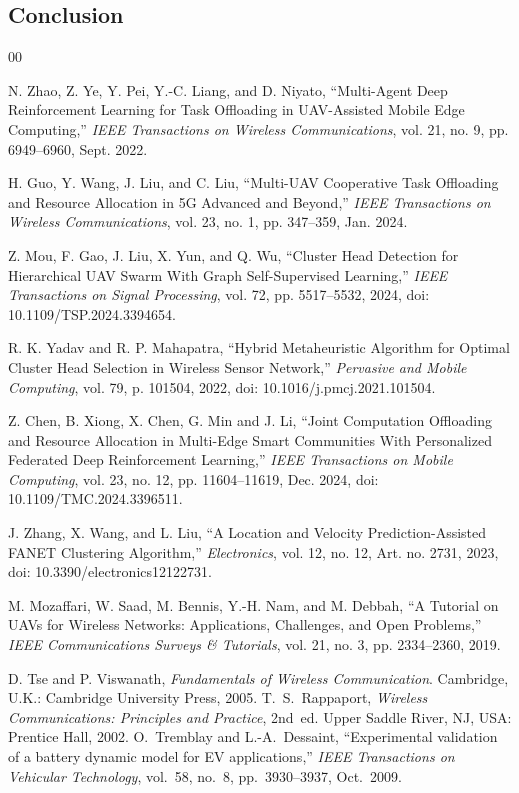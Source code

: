 \documentclass[journal]{IEEEtran}
\begin{document}
\begin{IEEEproof}
\section{Conclusion}


\begin{thebibliography}{00}

N. Zhao, Z. Ye, Y. Pei, Y.-C. Liang, and D. Niyato,
``Multi-Agent Deep Reinforcement Learning for Task Offloading in UAV-Assisted Mobile Edge Computing,''
\emph{IEEE Transactions on Wireless Communications},
vol. 21, no. 9, pp. 6949--6960, Sept. 2022.

H. Guo, Y. Wang, J. Liu, and C. Liu,
``Multi-UAV Cooperative Task Offloading and Resource Allocation in 5G Advanced and Beyond,''
\emph{IEEE Transactions on Wireless Communications},
vol. 23, no. 1, pp. 347--359, Jan. 2024.

Z. Mou, F. Gao, J. Liu, X. Yun, and Q. Wu,
``Cluster Head Detection for Hierarchical UAV Swarm With Graph Self-Supervised Learning,''
\emph{IEEE Transactions on Signal Processing},
vol. 72, pp. 5517--5532, 2024,
doi: 10.1109/TSP.2024.3394654.

R. K. Yadav and R. P. Mahapatra,
``Hybrid Metaheuristic Algorithm for Optimal Cluster Head Selection in Wireless Sensor Network,''
\emph{Pervasive and Mobile Computing},
vol. 79, p. 101504, 2022,
doi: 10.1016/j.pmcj.2021.101504.

Z. Chen, B. Xiong, X. Chen, G. Min and J. Li,
``Joint Computation Offloading and Resource Allocation in Multi-Edge Smart Communities With Personalized Federated Deep Reinforcement Learning,''
\emph{IEEE Transactions on Mobile Computing},
vol. 23, no. 12, pp. 11604--11619, Dec. 2024,
doi: 10.1109/TMC.2024.3396511.

J. Zhang, X. Wang, and L. Liu,
``A Location and Velocity Prediction-Assisted FANET Clustering Algorithm,''
\emph{Electronics},
vol. 12, no. 12, Art. no. 2731, 2023,
doi: 10.3390/electronics12122731.

M. Mozaffari, W. Saad, M. Bennis, Y.-H. Nam, and M. Debbah,
``A Tutorial on UAVs for Wireless Networks: Applications, Challenges, and Open Problems,''
\emph{IEEE Communications Surveys \& Tutorials},
vol. 21, no. 3, pp. 2334--2360, 2019.

D. Tse and P. Viswanath,
\emph{Fundamentals of Wireless Communication}.
Cambridge, U.K.: Cambridge University Press, 2005.
T.~S.~Rappaport,
\emph{Wireless Communications: Principles and Practice},
2nd~ed.
Upper Saddle River, NJ, USA: Prentice Hall, 2002.
O.~Tremblay and L.-A.~Dessaint,
``Experimental validation of a battery dynamic model for EV applications,''
\emph{IEEE Transactions on Vehicular Technology},
vol.~58, no.~8, pp.~3930--3937, Oct.~2009.



\end{thebibliography}
\end{IEEEproof}
\end{document}

